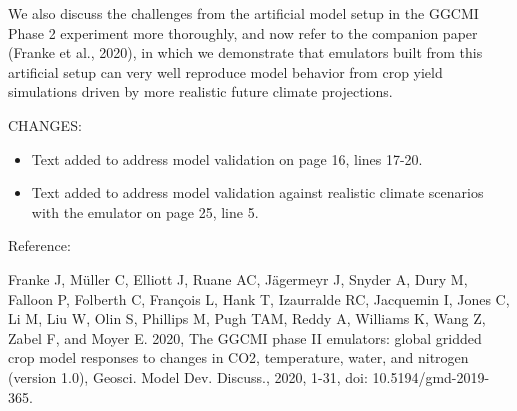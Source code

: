 \documentclass[gmd, manuscript]{copernicus} %
\begin{document}
We also discuss the challenges from the artificial model setup in the GGCMI Phase 2 experiment more thoroughly, and now refer to the companion paper (Franke et al., 2020), in which we demonstrate that emulators built from this artificial setup can very well reproduce model behavior from crop yield simulations driven by more realistic future climate projections.
\smallskip

CHANGES:
\begin{itemize}
    \item Text added to address model validation on page 16, lines 17-20.
    \item Text added to address model validation against realistic climate scenarios with the emulator on page 25, line 5.
\end{itemize}

\smallskip

Reference:

Franke J, Müller C, Elliott J, Ruane AC, Jägermeyr J, Snyder A, Dury M, Falloon P, Folberth C, François L, Hank T, Izaurralde RC, Jacquemin I, Jones C, Li M, Liu W, Olin S, Phillips M, Pugh TAM, Reddy A, Williams K, Wang Z, Zabel F, and Moyer E. 2020, The GGCMI phase II emulators: global gridded crop model responses to changes in CO2, temperature, water, and nitrogen (version 1.0), Geosci. Model Dev. Discuss., 2020, 1-31, doi: 10.5194/gmd-2019-365.
\end{document}
